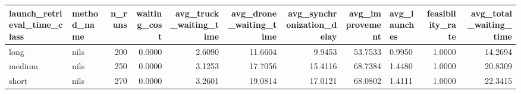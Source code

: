 \begin{tabular}{llrrrrrrlrr}
\toprule
launch_retrieval_time_class & method_name & n_runs & waiting_cost & avg_truck_waiting_time & avg_drone_waiting_time & avg_synchronization_delay & avg_improvement & avg_launches & feasibility_rate & avg_total_waiting_time \\
\midrule
long & nils & 200 & 0.0000 & 2.6090 & 11.6604 & 9.9453 & 53.7533 & 0.9950 & 1.0000 & 14.2694 \\
medium & nils & 250 & 0.0000 & 3.1253 & 17.7056 & 15.4116 & 68.7384 & 1.4480 & 1.0000 & 20.8309 \\
short & nils & 270 & 0.0000 & 3.2601 & 19.0814 & 17.0121 & 68.0802 & 1.4111 & 1.0000 & 22.3415 \\
\bottomrule
\end{tabular}
